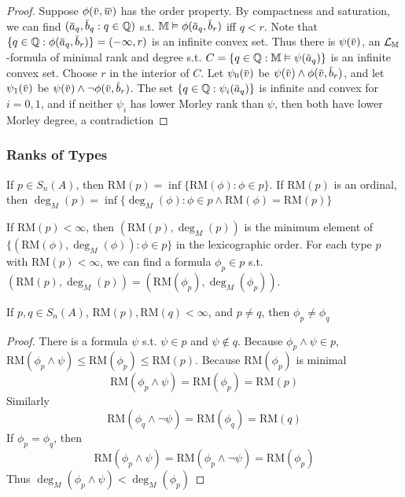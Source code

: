 \documentclass[11pt]{article}
\def \RM {\text{RM}}
\begin{document}
\begin{proof}
Suppose \(\phi(\barv,\barw)\) has the order property. By compactness and saturation, we can
find \((\bara_q,\barb_q:q\in\Q)\) s.t. \(\M\vDash\phi(\bara_q,\barb_r)\) iff \(q<r\).
Note that \(\{q\in\Q:\phi(\bara_q,\barb_r)\}=(-\infty,r)\) is an infinite convex set. Thus there
is \(\psi(\barv)\), an \(\mathcal{L}_{\mathbb{M}}\)-formula of minimal rank and degree s.t. \(C=\{q\in\Q:\M\vDash\psi(\bara_q)\}\)
is an infinite convex set.
Choose \(r\) in the interior of \(C\). Let \(\psi_0(\barv)\) be \(\psi(\barv)\wedge\phi(\barv,\barb_r)\), and
let \(\psi_1(\barv)\) be \(\psi(\barv)\wedge\neg\phi(\barv,\barb_r)\). The set \(\{q\in\Q:\psi_i(\bara_q)\}\) is infinite
and convex for \(i=0,1\), and if neither \(\psi_i\) has lower Morley rank than \(\psi\), then both have
lower Morley degree, a contradiction
\end{proof}
\subsubsection{Ranks of Types}
\label{sec:orgbe4653a}
\begin{definition}[]
If \(p\in S_n(A)\), then \(\RM(p)=\inf\{\RM(\phi):\phi\in p\}\). If \(\RM(p)\) is an ordinal,
then \(\deg_M(p)=\inf\{\deg_M(\phi):\phi\in p\wedge\RM(\phi)=\RM(p)\}\)
\end{definition}

If \(\RM(p)<\infty\), then \((\RM(p),\deg_M(p))\) is the minimum element
of \(\{(\RM(\phi),\deg_M(\phi)):\phi\in p\}\) in the lexicographic order. For each type \(p\)
with \(\RM(p)<\infty\), we can find a formula \(\phi_p\in p\)
s.t. \((\RM(p),\deg_M(p))=(\RM(\phi_p),\deg_M(\phi_p))\).

\begin{lemma}[]
If \(p,q\in S_n(A)\), \(\RM(p),\RM(q)<\infty\), and \(p\neq q\), then \(\phi_p\neq\phi_q\)
\end{lemma}

\begin{proof}
There is a formula \(\psi\) s.t. \(\psi\in p\) and \(\psi\notin q\).
Because \(\phi_p\wedge\psi\in p\), \(\RM(\phi_p\wedge\psi)\le\RM(\phi_p)\le\RM(p)\). Because \(\RM(\phi_p)\) is minimal
\begin{equation*}
\RM(\phi_p\wedge\psi)=\RM(\phi_p)=\RM(p)
\end{equation*}
Similarly
\begin{equation*}
\RM(\phi_q\wedge\neg\psi)=\RM(\phi_q)=\RM(q)
\end{equation*}
If \(\phi_p=\phi_q\), then
\begin{equation*}
\RM(\phi_p\wedge\psi)=\RM(\phi_p\wedge\neg\psi)=\RM(\phi_p)
\end{equation*}
Thus \(\deg_M(\phi_p\wedge\psi)<\deg_M(\phi_p)\)
\end{proof}
\end{document}
